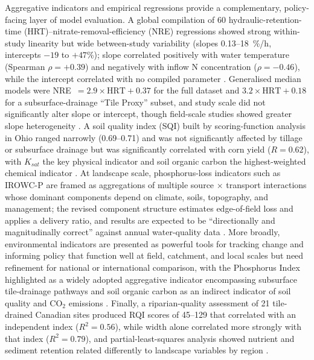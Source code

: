 Aggregative indicators and empirical regressions provide a complementary,
policy-facing layer of model evaluation. A global compilation of 60
hydraulic-retention-time (HRT)--nitrate-removal-efficiency (NRE) regressions
showed strong within-study linearity but wide between-study variability (slopes
0.13--18~\%/h, intercepts $-19$ to $+47$\%); slope correlated positively with
water temperature (Spearman $\rho=+0.39$) and negatively with inflow N
concentration ($\rho=-0.46$), while the intercept correlated with no compiled
parameter \parencite{Christianson2025c}. Generalised median models
were NRE~$=2.9\times\mathrm{HRT}+0.37$ for the full dataset and
$3.2\times\mathrm{HRT}+0.18$ for a subsurface-drainage ``Tile Proxy'' subset, and
study scale did not significantly alter slope or intercept, though field-scale
studies showed greater slope heterogeneity \parencite{Christianson2025c}. A soil
quality index (SQI) built by scoring-function analysis in Ohio ranged narrowly
(0.69--0.71) and was not significantly affected by tillage or subsurface drainage
but was significantly correlated with corn yield ($R=0.62$), with $K_{sat}$ the
key physical indicator and soil organic carbon the highest-weighted chemical
indicator \parencite{Nakajima2015}. At landscape scale, phosphorus-loss
indicators such as IROWC-P are framed as aggregations of multiple source $\times$
transport interactions whose dominant components depend on climate, soils,
topography, and management; the revised component structure estimates
edge-of-field loss and applies a delivery ratio, and results are expected to be
``directionally and magnitudinally correct'' against annual water-quality data
\parencite{Reid2018}. More broadly, environmental indicators are presented as
powerful tools for tracking change and informing policy that function well at
field, catchment, and local scales but need refinement for national or
international comparison, with the Phosphorus Index highlighted as a widely
adopted aggregative indicator encompassing subsurface tile-drainage pathways and
soil organic carbon as an indirect indicator of soil quality and CO$_2$ emissions
\parencite{Zhang2018}. Finally, a riparian-quality assessment of 21 tile-drained
Canadian sites produced RQI scores of 45--129 that correlated with an independent
index ($R^2=0.56$), while width alone correlated more strongly with that index
($R^2=0.79$), and partial-least-squares analysis showed nutrient and sediment
retention related differently to landscape variables by region
\parencite{Terrado2015}.